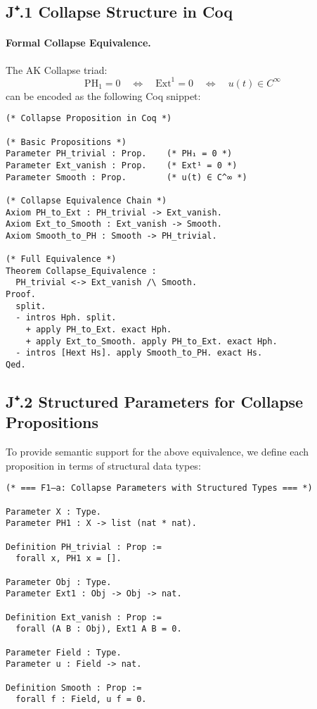 \documentclass[11pt]{article}
\theoremstyle{definition}
\begin{document}
\subsection*{J⁺.1 Collapse Structure in Coq}

\paragraph{Formal Collapse Equivalence.}

The AK Collapse triad:
\[
\mathrm{PH}_1 = 0 \quad \Leftrightarrow \quad \mathrm{Ext}^1 = 0 \quad \Leftrightarrow \quad u(t) \in C^\infty
\]
can be encoded as the following Coq snippet:

\begin{lstlisting}[language=Coq, caption=Collapse Structure in Coq Type Theory]
(* Collapse Proposition in Coq *)

(* Basic Propositions *)
Parameter PH_trivial : Prop.    (* PH₁ = 0 *)
Parameter Ext_vanish : Prop.    (* Ext¹ = 0 *)
Parameter Smooth : Prop.        (* u(t) ∈ C^∞ *)

(* Collapse Equivalence Chain *)
Axiom PH_to_Ext : PH_trivial -> Ext_vanish.
Axiom Ext_to_Smooth : Ext_vanish -> Smooth.
Axiom Smooth_to_PH : Smooth -> PH_trivial.

(* Full Equivalence *)
Theorem Collapse_Equivalence :
  PH_trivial <-> Ext_vanish /\ Smooth.
Proof.
  split.
  - intros Hph. split.
    + apply PH_to_Ext. exact Hph.
    + apply Ext_to_Smooth. apply PH_to_Ext. exact Hph.
  - intros [Hext Hs]. apply Smooth_to_PH. exact Hs.
Qed.
\end{lstlisting}

\subsection*{J⁺.2 Structured Parameters for Collapse Propositions}

To provide semantic support for the above equivalence,  
we define each proposition in terms of structural data types:

\begin{lstlisting}[language=Coq, caption=Structured Collapse Parameters in Coq]
(* === F1–a: Collapse Parameters with Structured Types === *)

Parameter X : Type.
Parameter PH1 : X -> list (nat * nat).

Definition PH_trivial : Prop :=
  forall x, PH1 x = [].

Parameter Obj : Type.
Parameter Ext1 : Obj -> Obj -> nat.

Definition Ext_vanish : Prop :=
  forall (A B : Obj), Ext1 A B = 0.

Parameter Field : Type.
Parameter u : Field -> nat.

Definition Smooth : Prop :=
  forall f : Field, u f = 0.
\end{lstlisting}
\end{document}
